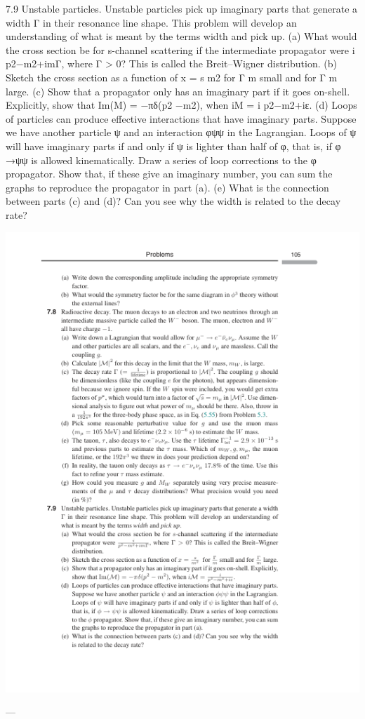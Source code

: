 7.9 Unstable particles. Unstable particles pick up imaginary parts that generate a width
Γ in their resonance line shape. This problem will develop an understanding of
what is meant by the terms width and pick up.
(a) What would the cross section be for s-channel scattering if the intermediate
propagator were
i
p2−m2+imΓ, where Γ > 0? This is called the Breit–Wigner
distribution.
(b) Sketch the cross section as a function of x =
s
m2 for Γ
m small and for Γ
m large.
(c) Show that a propagator only has an imaginary part if it goes on-shell. Explicitly,
show that Im(M) = −πδ(p2 −m2), when iM =
i
p2−m2+iε.
(d) Loops of particles can produce effective interactions that have imaginary parts.
Suppose we have another particle ψ and an interaction φψψ in the Lagrangian.
Loops of ψ will have imaginary parts if and only if ψ is lighter than half of φ,
that is, if φ →ψψ is allowed kinematically. Draw a series of loop corrections
to the φ propagator. Show that, if these give an imaginary number, you can sum
the graphs to reproduce the propagator in part (a).
(e) What is the connection between parts (c) and (d)? Can you see why the width
is related to the decay rate?

\includegraphics{./figs/7_Feynman_rules_page_125.png}

---

